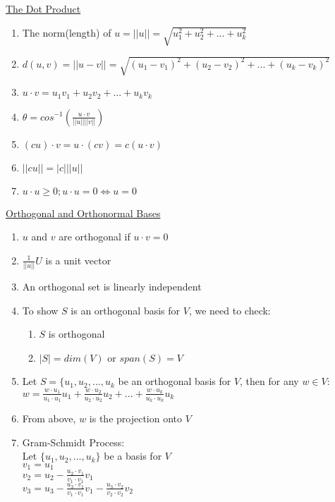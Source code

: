 \documentclass[a4paper,1pt,landscape]{article}
\begin{document}
\begin{multicols}{3}
\underline{The Dot Product}
\begin{enumerate}
\item The norm(length) of $u = ||u|| = \sqrt{u_1^2 + u_2^2 + ... + u_k^2}$
\item $d(u, v) = ||u - v|| = \sqrt{(u_1 - v_1)^2 + (u_2 - v_2)^2 + ... + (u_k - v_k)^2}$
\item $u \cdot v = u_1v_1 + u_2v_2 + ... + u_kv_k$
\item $\theta = cos^{-1}(\frac{u \cdot v}{||u|| ||v||})$
\item $(cu) \cdot v = u \cdot (cv) = c(u \cdot v)$
\item $||cu|| = |c| ||u||$
\item $u \cdot u \geq 0; u \cdot u = 0 \Leftrightarrow u = 0$
\end{enumerate}

\underline{Orthogonal and Orthonormal Bases}
\begin{enumerate}
    \item $u$ and $v$ are orthogonal if $u \cdot v = 0$
    \item $\frac{1}{||u||} U$ is a unit vector
    \item An orthogonal set is linearly independent
    \item To show $S$ is an orthogonal basis for $V$, we need to check: \begin{enumerate}
        \item $S$ is orthogonal
        \item $|S| = dim(V)$ or $span(S) = V$
    \end{enumerate}
    \item Let $S = \{u_1, u_2, ..., u_k$ be an orthogonal basis for $V$, then for any $w \in V$: $w = \frac{w\cdot u_1}{u_1 \cdot u_1}u_1 + \frac{w\cdot u_2}{u_2 \cdot u_2}u_2 + ... + \frac{w\cdot u_k}{u_k \cdot u_k}u_k$
    \item From above, $w$ is the projection onto $V$
    \item Gram-Schmidt Process: \\ 
    Let $\{u_1, u_2, ..., u_k\}$ be a basis for $V$ \\
    $v_1 = u_1$ \\
    $v_2 = u_2 - \frac{u_2 \cdot v_1}{v_1 \cdot v_1}v_1$ \\
    $v_3 = u_3 - \frac{u_3 \cdot v_1}{v_1 \cdot v_1}v_1 - \frac{u_3 \cdot v_2}{v_2 \cdot v_2}v_2$ \\   
\end{enumerate}


\end{multicols}
\end{document}
